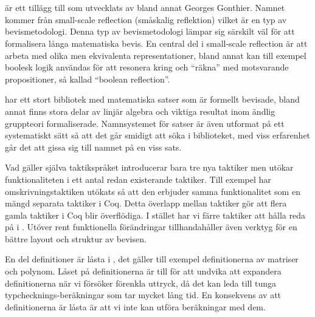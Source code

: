 \section{\ssr{}}
\label{sec:ssr}
\ssr{} är ett tillägg till \coq{} som utvecklats av bland annat Georges
Gonthier. Namnet kommer från small-scale reflection (småskalig reflektion)
vilket är en typ av bevismetodologi. Denna typ av bevismetodologi lämpar sig
särskilt väl för att formalisera långa matematiska bevis. En central del i
small-scale reflection är att arbeta med olika men ekvivalenta
representationer, bland annat kan till exempel boolesk logik användas för att
resonera kring och ``räkna'' med motsvarande propositioner, så kallad ``boolean
reflection''.

\ssr{} har ett stort bibliotek med matematiska satser som är formellt bevisade,
bland annat finns stora delar av linjär algebra och viktiga resultat inom
ändlig gruppteori formaliserade. Namnsystemet för satser är även utformat på
ett systematiskt sätt så att det går smidigt att söka i biblioteket, med viss
erfarenhet går det att gissa sig till namnet på en viss sats.

Vad gäller själva taktikspråket introducerar \ssr{} bara tre nya taktiker men
utökar funktionaliteten i ett antal redan existerande taktiker. Till exempel
har omskrivningstaktiken  utökats så att den erbjuder samma
funktionalitet som en mängd separata taktiker i Coq. Detta överlapp mellan
taktiker gör att flera gamla taktiker i Coq blir överflödiga. I stället har
vi färre taktiker att hålla reda på i \ssr{}. Utöver rent funktionella
förändringar tillhandahåller \ssr{} även verktyg för en bättre layout och
struktur av bevisen.

En del definitioner är låsta i \ssr{}, det gäller till exempel definitionerna
av matriser och polynom. Låset på definitionerna är till för att undvika att
expandera definitionerna när vi försöker förenkla uttryck, då det kan leda till
tunga typchecknings-beräkningar som tar mycket lång tid. En konsekvens av att
definitionerna är låsta är att vi inte kan utföra beräkningar med dem.

